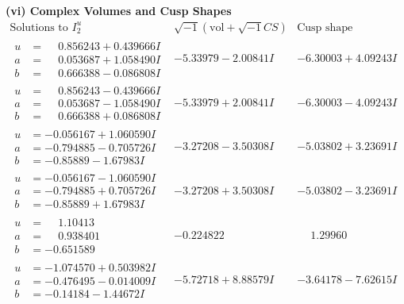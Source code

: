 \documentclass[1p]{elsarticle_modified}
\theoremstyle{definition}
\newcommand{\I}{\sqrt{-1}}
\begin{document}
\newpage\flushleft \textbf{(vi) Complex Volumes and Cusp Shapes}
$$\begin{array}{c|c|c}  
\text{Solutions to }I^u_{2}& \I (\text{vol} + \sqrt{-1}CS) & \text{Cusp shape}\\
 \hline 
\begin{aligned}
u &= \phantom{-}0.856243 + 0.439666 I \\
a &= \phantom{-}0.053687 + 1.058490 I \\
b &= \phantom{-}0.666388 - 0.086808 I\end{aligned}
 & -5.33979 - 2.00841 I & -6.30003 + 4.09243 I \\ \hline\begin{aligned}
u &= \phantom{-}0.856243 - 0.439666 I \\
a &= \phantom{-}0.053687 - 1.058490 I \\
b &= \phantom{-}0.666388 + 0.086808 I\end{aligned}
 & -5.33979 + 2.00841 I & -6.30003 - 4.09243 I \\ \hline\begin{aligned}
u &= -0.056167 + 1.060590 I \\
a &= -0.794885 - 0.705726 I \\
b &= -0.85889 - 1.67983 I\end{aligned}
 & -3.27208 - 3.50308 I & -5.03802 + 3.23691 I \\ \hline\begin{aligned}
u &= -0.056167 - 1.060590 I \\
a &= -0.794885 + 0.705726 I \\
b &= -0.85889 + 1.67983 I\end{aligned}
 & -3.27208 + 3.50308 I & -5.03802 - 3.23691 I \\ \hline\begin{aligned}
u &= \phantom{-}1.10413\phantom{ +0.000000I} \\
a &= \phantom{-}0.938401\phantom{ +0.000000I} \\
b &= -0.651589\phantom{ +0.000000I}\end{aligned}
 & -0.224822\phantom{ +0.000000I} & \phantom{-}1.29960\phantom{ +0.000000I} \\ \hline\begin{aligned}
u &= -1.074570 + 0.503982 I \\
a &= -0.476495 - 0.014009 I \\
b &= -0.14184 - 1.44672 I\end{aligned}
 & -5.72718 + 8.88579 I & -3.64178 - 7.62615 I \\ \hline\begin{aligned}

\end{aligned}
\end{array}$$
\end{document}
